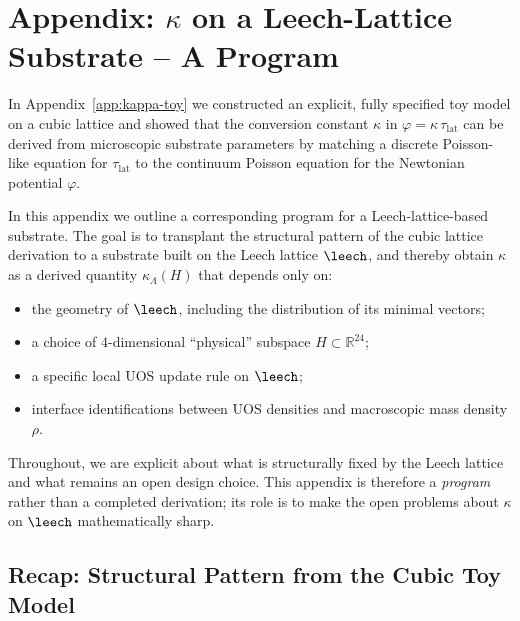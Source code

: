 
\section{Appendix: $\kappa$ on a Leech-Lattice Substrate -- A Program}
\label{app:kappa-leech}

In Appendix~\ref{app:kappa-toy} we constructed an explicit, fully specified
toy model on a cubic lattice and showed that the conversion constant
$\kappa$ in $\varphi = \kappa\,\tau_{\mathrm{lat}}$ can be derived from
microscopic substrate parameters by matching a discrete Poisson-like equation
for $\tau_{\mathrm{lat}}$ to the continuum Poisson equation for the
Newtonian potential $\varphi$.

In this appendix we outline a corresponding program for a Leech-lattice-based
substrate. The goal is to transplant the structural pattern of the cubic
lattice derivation to a substrate built on the Leech lattice $\leech$, and
thereby obtain $\kappa$ as a derived quantity $\kappa_{\Lambda}(H)$ that
depends only on:
\begin{itemize}
  \item the geometry of $\leech$, including the distribution of its minimal
        vectors;
  \item a choice of $4$-dimensional ``physical'' subspace
        $H \subset \mathbb{R}^{24}$;
  \item a specific local UOS update rule on $\leech$;
  \item interface identifications between UOS densities and macroscopic mass
        density $\rho$.
\end{itemize}
Throughout, we are explicit about what is structurally fixed by the Leech
lattice and what remains an open design choice. This appendix is therefore a
\emph{program} rather than a completed derivation; its role is to make the
open problems about $\kappa$ on $\leech$ mathematically sharp.

\subsection{Recap: Structural Pattern from the Cubic Toy Model}
\label{subsec:kappa-leech-recap}

